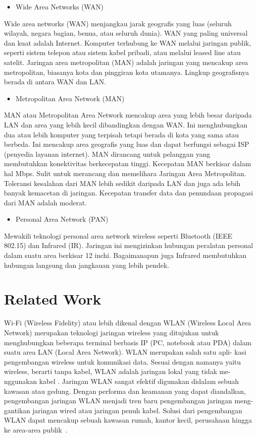 \documentclass[conference]{IEEEtran}
\begin{document}
\begin{itemize}
    \item Wide Area Networks (WAN)
\end{itemize}
Wide area networks (WAN) menjangkau jarak geografis yang luas (seluruh wilayah, negara bagian, benua, atau seluruh dunia). 
WAN yang paling universal dan kuat adalah Internet.
Komputer terhubung ke WAN melalui jaringan publik, seperti sistem telepon atau sistem kabel pribadi, atau melalui leased line atau satelit. 
Jaringan area metropolitan (MAN) adalah jaringan yang mencakup area metropolitan, biasanya kota dan pinggiran kota utamanya. 
Lingkup geografisnya berada di antara WAN dan LAN.

\begin{itemize}
    \item Metropolitan Area Network (MAN)
\end{itemize}
MAN atau Metropolitan Area Network mencakup area yang lebih besar daripada LAN dan area yang lebih kecil dibandingkan dengan WAN.
Ini menghubungkan dua atau lebih komputer yang terpisah tetapi berada di kota yang sama atau berbeda. 
Ini mencakup area geografis yang luas dan dapat berfungsi sebagai ISP (penyedia layanan internet).
MAN dirancang untuk pelanggan yang membutuhkan konektivitas berkecepatan tinggi.
Kecepatan MAN berkisar dalam hal Mbps. Sulit untuk merancang dan memelihara Jaringan Area Metropolitan. 
Toleransi kesalahan dari MAN lebih sedikit daripada LAN dan juga ada lebih banyak kemacetan di jaringan.
Kecepatan transfer data dan penundaan propagasi dari MAN adalah moderat.

\begin{itemize}
    \item Personal Area Network (PAN)
\end{itemize}
Mewakili teknologi personal area network wireless seperti Bluetooth (IEEE 802.15) dan Infrared (IR). 
Jaringan ini mengizinkan hubungan peralatan personal dalam suatu area berkisar 12 inchi. 
Bagaimanapun juga Infrared membutuhkan hubungan langsung dan jangkauan yang lebih pendek.

\section{Related Work}
Wi-Fi (Wireless Fidelity) atau lebih dikenal dengan
WLAN (Wireless Local Area Network) merupakan
teknologi jaringan wireless yang ditujukan untuk
menghubungkan beberapa terminal berbasis IP (PC,
notebook atau PDA) dalam suatu area LAN (Local
Area Network). WLAN merupakan salah satu apli-
kasi pengembangan wireless untuk komunikasi data.
Sesuai dengan namanya yaitu wireless, berarti tanpa
kabel, WLAN adalah jaringan lokal yang tidak me-
nggunakan kabel . Jaringan WLAN
sangat efektif digunakan didalam sebuah kawasan
atau gedung. Dengan performa dan keamanan yang
dapat diandalkan, pengembangan jaringan WLAN
menjadi tren baru pengembangan jaringan meng-
gantikan jaringan wired atau jaringan penuh kabel.
Solusi dari pengembangan WLAN dapat mencakup
sebuah kawasan rumah, kantor kecil, perusahaan
hingga ke area-area publik~. 
\end{document}
